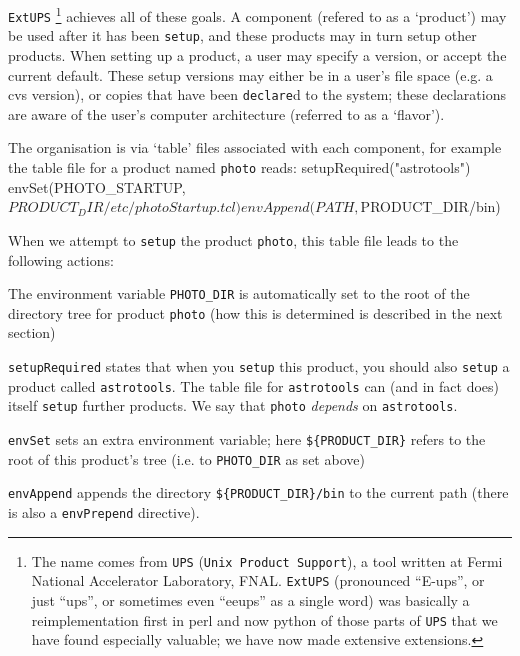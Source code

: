 \documentclass{article}
\newcommand{\code}[1]{\texttt{#1}}
\newcommand{\eups}{\code{ExtUPS}}
\let\overbatim=\verbatim
\let\oendverbatim=\endverbatim
\renewenvironment{verbatim}
{\center\minipage{16cm}\overbatim}
{\oendverbatim\endminipage\endcenter}
\begin{document}
\eups
\footnote{%
  The name comes from \code{UPS} (\code{Unix Product Support}), a
  tool written at Fermi National Accelerator Laboratory, FNAL. \eups{} (pronounced ``E-ups'',
  or just ``ups'', or sometimes even ``eeups'' as a single word) 
  was basically a reimplementation first in perl and now python of those parts of \code{UPS}
  that we have found especially valuable;  we have now made extensive extensions.}
achieves all of these goals. A component (refered to as a `product')
may be used after it has been \code{setup}, and these products may
in turn setup other products. When setting up a product, a user
may specify a version, or accept the current default. These setup versions
may either be in a user's file space (e.g. a cvs version), or copies
that have been \code{declare}d to the system; these declarations are
aware of the user's computer architecture (referred to as a `flavor').

The organisation is via `table' files
associated with each component, for example the table file
for a product named \code{photo} reads:
\begin{verbatim}
       setupRequired("astrotools")
       envSet(PHOTO_STARTUP, ${PRODUCT_DIR}/etc/photoStartup.tcl)
       envAppend(PATH, ${PRODUCT_DIR}/bin)
\end{verbatim}

When we attempt to \code{setup} the product \code{photo}, this
table file leads to the following actions:
\begin{description}
\item
  The environment variable \code{PHOTO\_DIR} is automatically set to 
  the root of the directory tree for product \code{photo} (how this
  is determined is described in the next section)
\item
  \code{setupRequired} states that when you \code{setup} this product, you
  should also \code{setup} a product called \code{astrotools}.
  The table file for \code{astrotools} can
  (and in fact does) itself \code{setup} further products.  We say that
  \code{photo} \emph{depends} on \code{astrotools}.
\item
  \code{envSet} sets an extra environment variable; here \code{\$\{PRODUCT\_DIR\}}
  refers to the root of this product's tree (i.e. to \code{PHOTO\_DIR} as set above)
\item
  \code{envAppend} appends
  the directory \code{\$\{PRODUCT\_DIR\}/bin} to the current path (there
  is also a \code{envPrepend} directive).
\end{description}
\end{document}
